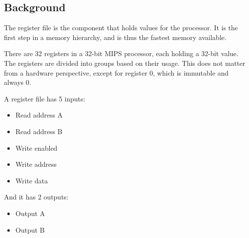 \documentclass{beamer}
\begin{document}
\subsection{Background}
\begin{frame}
    The register file is the component that holds values for the processor. It
    is the first step in a memory hierarchy, and is thus the fastest memory
    available.

    \vspace{\baselineskip}
    There are 32 registers in a 32-bit MIPS processor, each holding a 32-bit
    value. The registers are divided into groups based on their usage. This
    does not matter from a hardware perspective, except for register 0, which
    is immutable and always 0.
\end{frame}
\begin{frame}
    A register file has 5 inputs:
    \begin{itemize}
        \item Read address A
        \item Read address B
        \item Write enabled
        \item Write address
        \item Write data
    \end{itemize}
    And it has 2 outputs:
    \begin{itemize}
        \item Output A
        \item Output B
    \end{itemize}
\end{frame}
\end{document}
